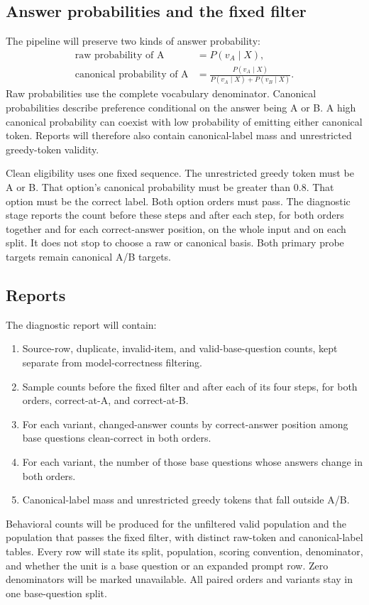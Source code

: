 \documentclass[11pt]{article}
\begin{document}
\subsection*{Answer probabilities and the fixed filter}

The pipeline will preserve two kinds of answer probability:
\begin{align*}
\text{raw probability of A}&=P(v_A\mid X),\\
\text{canonical probability of A}&=\frac{P(v_A\mid X)}{P(v_A\mid X)+P(v_B\mid X)}.
\end{align*}
Raw probabilities use the complete vocabulary denominator.
Canonical probabilities describe preference conditional on the answer being A or B.
A high canonical probability can coexist with low probability of emitting either canonical token.
Reports will therefore also contain canonical-label mass and unrestricted greedy-token validity.

Clean eligibility uses one fixed sequence.
The unrestricted greedy token must be A or B.
That option's canonical probability must be greater than 0.8.
That option must be the correct label.
Both option orders must pass.
The diagnostic stage reports the count before these steps and after each step, for both orders together and for each correct-answer position, on the whole input and on each split.
It does not stop to choose a raw or canonical basis.
Both primary probe targets remain canonical A/B targets.

\subsection*{Reports}

The diagnostic report will contain:
\begin{enumerate}
\item Source-row, duplicate, invalid-item, and valid-base-question counts, kept separate from model-correctness filtering.
\item Sample counts before the fixed filter and after each of its four steps, for both orders, correct-at-A, and correct-at-B.
\item For each variant, changed-answer counts by correct-answer position among base questions clean-correct in both orders.
\item For each variant, the number of those base questions whose answers change in both orders.
\item Canonical-label mass and unrestricted greedy tokens that fall outside A/B.
\end{enumerate}
Behavioral counts will be produced for the unfiltered valid population and the population that passes the fixed filter, with distinct raw-token and canonical-label tables.
Every row will state its split, population, scoring convention, denominator, and whether the unit is a base question or an expanded prompt row.
Zero denominators will be marked unavailable.
All paired orders and variants stay in one base-question split.
\end{document}
